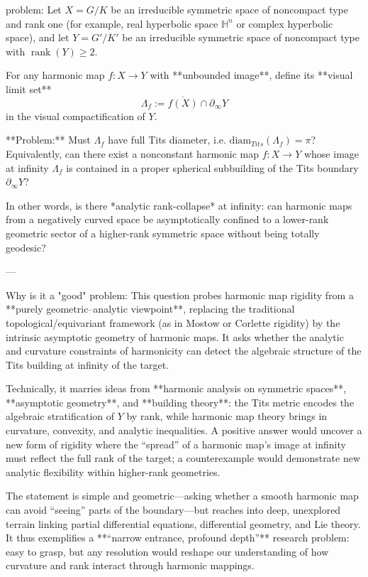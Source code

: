 problem:  
Let \( X = G/K \) be an irreducible symmetric space of noncompact type and rank one (for example, real hyperbolic space \( \mathbb{H}^n \) or complex hyperbolic space), and let \( Y = G'/K' \) be an irreducible symmetric space of noncompact type with \( \operatorname{rank}(Y) \ge 2 \).  

For any harmonic map \( f : X \to Y \) with **unbounded image**, define its **visual limit set**  
\[
\Lambda_f := \overline{f(X)} \cap \partial_\infty Y
\]
in the visual compactification of \( Y \).  

**Problem:**  
Must \( \Lambda_f \) have full Tits diameter, i.e. \( \mathrm{diam}_{Tits}(\Lambda_f) = \pi \)?  
Equivalently, can there exist a nonconstant harmonic map \( f : X \to Y \) whose image at infinity \( \Lambda_f \) is contained in a proper spherical subbuilding of the Tits boundary \( \partial_\infty Y \)?  

In other words, is there *analytic rank-collapse* at infinity: can harmonic maps from a negatively curved space be asymptotically confined to a lower-rank geometric sector of a higher-rank symmetric space without being totally geodesic?

---

Why is it a "good" problem:  
This question probes harmonic map rigidity from a **purely geometric–analytic viewpoint**, replacing the traditional topological/equivariant framework (as in Mostow or Corlette rigidity) by the intrinsic asymptotic geometry of harmonic maps.  It asks whether the analytic and curvature constraints of harmonicity can detect the algebraic structure of the Tits building at infinity of the target.  

Technically, it marries ideas from **harmonic analysis on symmetric spaces**, **asymptotic geometry**, and **building theory**: the Tits metric encodes the algebraic stratification of \( Y \) by rank, while harmonic map theory brings in curvature, convexity, and analytic inequalities. A positive answer would uncover a new form of rigidity where the “spread” of a harmonic map’s image at infinity must reflect the full rank of the target; a counterexample would demonstrate new analytic flexibility within higher-rank geometries.  

The statement is simple and geometric—asking whether a smooth harmonic map can avoid “seeing” parts of the boundary—but reaches into deep, unexplored terrain linking partial differential equations, differential geometry, and Lie theory. It thus exemplifies a **“narrow entrance, profound depth”** research problem: easy to grasp, but any resolution would reshape our understanding of how curvature and rank interact through harmonic mappings.